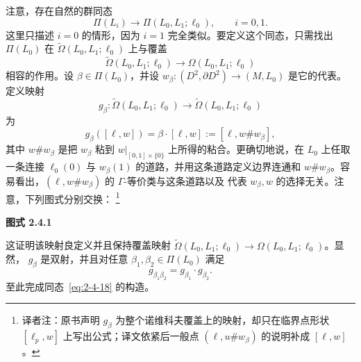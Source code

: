 注意，存在自然的群同态
\begin{equation}
  \Pi(L_i)\longrightarrow\Pi(L_0,L_1;\ell_0),
  \qquad i=0,1.
  \tag{2.4.18}\label{eq:2-4-18}
\end{equation}
这里只描述 $i=0$ 的情形，因为 $i=1$ 完全类似。要定义这个同态，只需找出
$\Pi(L_0)$ 在 $\widetilde\Omega(L_0,L_1;\ell_0)$ 上与覆盖
\[
  \widetilde\Omega(L_0,L_1;\ell_0)
  \longrightarrow\Omega(L_0,L_1;\ell_0)
\]
相容的作用。设 $\beta\in\Pi(L_0)$，并设
$w_\beta:(D^2,\partial D^2)\to(M,L_0)$ 是它的代表。定义映射
\[
  g_\beta:\widetilde\Omega(L_0,L_1;\ell_0)
  \longrightarrow\widetilde\Omega(L_0,L_1;\ell_0)
\]
为
\[
  g_\beta([\ell,w])
  =\beta\cdot[\ell,w]
  :=[\ell,w\#w_\beta],
\]
其中 $w\#w_\beta$ 是把 $w_\beta$ 粘到
$w|_{[0,1]\times\{0\}}$ 上所得的粘合。更确切地说，在 $L_0$ 上任取一条连接
$\ell_0(0)$ 与 $w_\beta(1)$ 的道路，并用这条道路定义边界连通和
$w\#w_\beta$。容易看出，$(\ell,w\#w_\beta)$ 的 $\Gamma$-等价类与这条道路以及
代表 $w_\beta,w$ 的选择无关。注意，下列图式分别交换：
\footnote{译者注：原书声明 $g_\beta$ 为整个诺维科夫覆盖上的映射，却只在临界点形状 $[\ell_p,w]$ 上写出公式；译文依紧后一般点 $(\ell,u\#w_\beta)$ 的说明补成 $[\ell,w]$。}

\begin{center}
  \par\smallskip\textbf{图式 2.4.1}
\end{center}

这证明该映射良定义并且保持覆盖映射
$\widetilde\Omega(L_0,L_1;\ell_0)\to\Omega(L_0,L_1;\ell_0)$。显然，
$g_\beta$ 是双射，并且对任意 $\beta_1,\beta_2\in\Pi(L_0)$ 满足
\[
  g_{\beta_1\beta_2}=g_{\beta_1}\cdot g_{\beta_2}.
\]
至此完成同态~\eqref{eq:2-4-18} 的构造。


